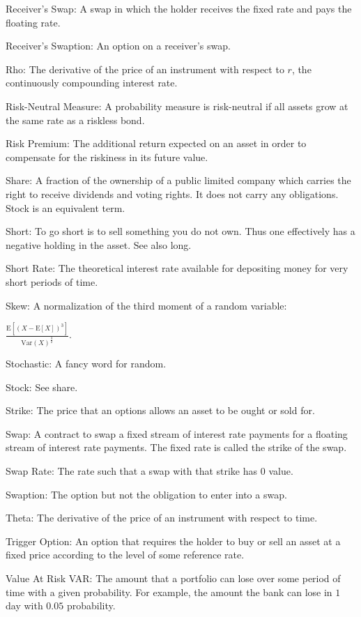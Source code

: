 Receiver's Swap: A swap in which the holder receives the fixed rate and pays the floating rate.

Receiver's Swaption: An option on a receiver's swap.

Rho: The derivative of the price of an instrument with respect to $r$, the continuously compounding interest rate.

Risk-Neutral Measure: A probability measure is risk-neutral if all assets grow at the same rate as a riskless bond.

Risk Premium: The additional return expected on an asset in order to compensate for the riskiness in its future value.

Share: A fraction of the ownership of a public limited company which carries the right to receive dividends and voting rights. It does not carry any obligations. Stock is an equivalent term.

Short: To go short is to sell something you do not own. Thus one effectively has a negative holding in the asset. See also long.

Short Rate: The theoretical interest rate available for depositing money for very short periods of time.

Skew: A normalization of the third moment of a random variable:

$\frac{\text{E}[(X-\text{E}[X])^3]}{\text{Var}(X)^{\frac{3}{2}}}$.

Stochastic: A fancy word for random.

Stock: See share.

Strike: The price that an options allows an asset to be ought or sold for.

Swap: A contract to swap a fixed stream of interest rate payments for a floating stream of interest rate payments. The fixed rate is called the strike of the swap.

Swap Rate: The rate such that a swap with that strike has $0$ value.

Swaption: The option but not the obligation to enter into a swap.

Theta: The derivative of the price of an instrument with respect to time.

Trigger Option: An option that requires the holder to buy or sell an asset at a fixed price according to the level of some reference rate.

Value At Risk VAR: The amount that a portfolio can lose over some period of time with a given probability. For example, the amount the bank can lose in $1$ day with $0.05$ probability.

